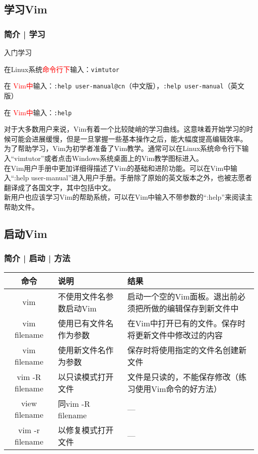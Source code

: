 \subsection{学习Vim}
\begin{frame}[fragile]
  \frametitle{简介 | 学习}
  \begin{block}{\alert{入门学习}}
    \begin{description}[<+->]
      \item[Vim初学者教学] 在Linux系统\textcolor{red}{命令行下}输入：\verb|vimtutor|
      \item[Vim用户手册] 在 \textcolor{red}{Vim中}输入：\verb|:help user-manual@cn|（中文版），\verb|:help user-manual|（英文版）
      \item[Vim帮助系统] 在 \textcolor{red}{Vim中}输入：\verb|:help|
    \end{description}
  \end{block}
  {\footnotesize
  对于大多数用户来说，Vim有着一个比较陡峭的学习曲线。这意味着开始学习的时候可能会进展缓慢，但是一旦掌握一些基本操作之后，能大幅度提高编辑效率。\\
  为了帮助学习，Vim为初学者准备了Vim教学。通常可以在Linux系统命令行下输入“vimtutor”或者点击Windows系统桌面上的Vim教学图标进入。\\
  在Vim用户手册中更加详细得描述了Vim的基础和进阶功能。可以在Vim中输入“:help user-manual”进入用户手册。手册除了原始的英文版本之外，也被志愿者翻译成了各国文字，其中包括中文。\\
  新用户也应该学习Vim的帮助系统，可以在Vim中输入不带参数的“:help”来阅读主帮助文件。}
\end{frame}

\subsection{启动Vim}
\begin{frame}
  \frametitle{简介 | 启动 | \alert{方法}}
  \begin{table}
    \centering
    \begin{tabularx}{\textwidth}{cXX}
      \hline
      \rowcolor{blue!50}命令 & 说明 & 结果\\
      \hline
      vim & 不使用文件名参数启动Vim & 启动一个空的Vim面板。退出前必须把所做的编辑保存到新文件中\\
      vim filename & 使用已有文件名作为参数 & 在Vim中打开已有的文件。保存时将更新文件中修改过的内容\\
      vim filename & 使用新文件名作为参数 & 保存时将使用指定的文件名创建新文件\\
      vim -R filename & 以只读模式打开文件 & 文件是只读的，不能保存修改（\alert{练习使用Vim命令的好方法}）\\
      view filename & 同vim -R filename & ---\\
      vim -r filename & 以修复模式打开文件 & ---\\
      \hline
    \end{tabularx}
  \end{table}
\end{frame}

